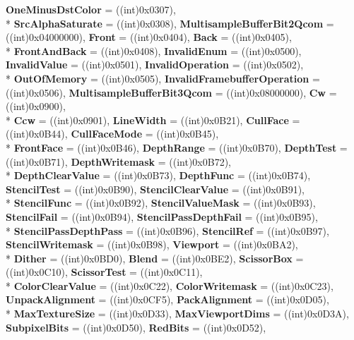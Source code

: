 \begin{DoxyCompactItemize}
{\bfseries One\-Minus\-Dst\-Color} = ((int)0x0307), 
\\*
{\bfseries Src\-Alpha\-Saturate} = ((int)0x0308), 
{\bfseries Multisample\-Buffer\-Bit2\-Qcom} = ((int)0x04000000), 
{\bfseries Front} = ((int)0x0404), 
{\bfseries Back} = ((int)0x0405), 
\\*
{\bfseries Front\-And\-Back} = ((int)0x0408), 
{\bfseries Invalid\-Enum} = ((int)0x0500), 
{\bfseries Invalid\-Value} = ((int)0x0501), 
{\bfseries Invalid\-Operation} = ((int)0x0502), 
\\*
{\bfseries Out\-Of\-Memory} = ((int)0x0505), 
{\bfseries Invalid\-Framebuffer\-Operation} = ((int)0x0506), 
{\bfseries Multisample\-Buffer\-Bit3\-Qcom} = ((int)0x08000000), 
{\bfseries Cw} = ((int)0x0900), 
\\*
{\bfseries Ccw} = ((int)0x0901), 
{\bfseries Line\-Width} = ((int)0x0\-B21), 
{\bfseries Cull\-Face} = ((int)0x0\-B44), 
{\bfseries Cull\-Face\-Mode} = ((int)0x0\-B45), 
\\*
{\bfseries Front\-Face} = ((int)0x0\-B46), 
{\bfseries Depth\-Range} = ((int)0x0\-B70), 
{\bfseries Depth\-Test} = ((int)0x0\-B71), 
{\bfseries Depth\-Writemask} = ((int)0x0\-B72), 
\\*
{\bfseries Depth\-Clear\-Value} = ((int)0x0\-B73), 
{\bfseries Depth\-Func} = ((int)0x0\-B74), 
{\bfseries Stencil\-Test} = ((int)0x0\-B90), 
{\bfseries Stencil\-Clear\-Value} = ((int)0x0\-B91), 
\\*
{\bfseries Stencil\-Func} = ((int)0x0\-B92), 
{\bfseries Stencil\-Value\-Mask} = ((int)0x0\-B93), 
{\bfseries Stencil\-Fail} = ((int)0x0\-B94), 
{\bfseries Stencil\-Pass\-Depth\-Fail} = ((int)0x0\-B95), 
\\*
{\bfseries Stencil\-Pass\-Depth\-Pass} = ((int)0x0\-B96), 
{\bfseries Stencil\-Ref} = ((int)0x0\-B97), 
{\bfseries Stencil\-Writemask} = ((int)0x0\-B98), 
{\bfseries Viewport} = ((int)0x0\-B\-A2), 
\\*
{\bfseries Dither} = ((int)0x0\-B\-D0), 
{\bfseries Blend} = ((int)0x0\-B\-E2), 
{\bfseries Scissor\-Box} = ((int)0x0\-C10), 
{\bfseries Scissor\-Test} = ((int)0x0\-C11), 
\\*
{\bfseries Color\-Clear\-Value} = ((int)0x0\-C22), 
{\bfseries Color\-Writemask} = ((int)0x0\-C23), 
{\bfseries Unpack\-Alignment} = ((int)0x0\-C\-F5), 
{\bfseries Pack\-Alignment} = ((int)0x0\-D05), 
\\*
{\bfseries Max\-Texture\-Size} = ((int)0x0\-D33), 
{\bfseries Max\-Viewport\-Dims} = ((int)0x0\-D3\-A), 
{\bfseries Subpixel\-Bits} = ((int)0x0\-D50), 
{\bfseries Red\-Bits} = ((int)0x0\-D52), 

\end{DoxyCompactItemize}
